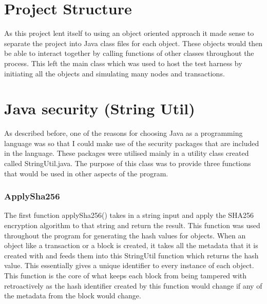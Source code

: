 \documentclass{l4proj}
\begin{document}
\section{Project Structure}
As this project lent itself to using an object oriented approach it made sense to separate the project into
Java class files for each object. These objects would then be able to interact together by calling functions
of other classes throughout the process. This left the main class which was used to host the test harness by
initiating all the objects and simulating many nodes and transactions.


\section{Java security (String Util)}
As described before, one of the reasons for choosing Java as a programming language was so that I could make use
of the security packages that are included in the language. These packages were utilised mainly in a utility class created
called StringUtil.java. The purpose of this class was to provide three functions that would be used in other aspects
of the program. 
\subsubsection{ApplySha256}
The first function applySha256() takes in a string input and apply the SHA256 encryption
algorithm to that string and return the result. This function was used throughout the program for generating
the hash values for objects. When an object like a transaction or a block is created, it takes all the metadata that
it is created with and feeds them into this StringUtil function which returns the hash value. This essentially gives
a unique identifier to every instance of each object. This function is the core of what keeps each block from being
tampered with retroactively as the hash identifier created by this function would change if any of the metadata from
the block would change.

\end{document}
